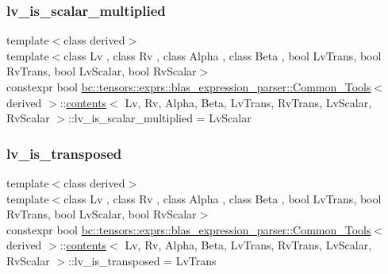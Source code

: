 \subsubsection{\texorpdfstring{lv\+\_\+is\+\_\+scalar\+\_\+multiplied}{lv\_is\_scalar\_multiplied}}
{\footnotesize\ttfamily template$<$class derived$>$ \\
template$<$class Lv , class Rv , class Alpha , class Beta , bool Lv\+Trans, bool Rv\+Trans, bool Lv\+Scalar, bool Rv\+Scalar$>$ \\
constexpr bool \hyperlink{structbc_1_1tensors_1_1exprs_1_1blas__expression__parser_1_1Common__Tools}{bc\+::tensors\+::exprs\+::blas\+\_\+expression\+\_\+parser\+::\+Common\+\_\+\+Tools}$<$ derived $>$\+::\hyperlink{structbc_1_1tensors_1_1exprs_1_1blas__expression__parser_1_1Common__Tools_1_1contents}{contents}$<$ Lv, Rv, Alpha, Beta, Lv\+Trans, Rv\+Trans, Lv\+Scalar, Rv\+Scalar $>$\+::lv\+\_\+is\+\_\+scalar\+\_\+multiplied = Lv\+Scalar\hspace{0.3cm}{\ttfamily [static]}}

\mbox{\label{structbc_1_1tensors_1_1exprs_1_1blas__expression__parser_1_1Common__Tools_1_1contents_a70834b5071003cd8b6992a2304e4fb9d}} 
\subsubsection{\texorpdfstring{lv\+\_\+is\+\_\+transposed}{lv\_is\_transposed}}
{\footnotesize\ttfamily template$<$class derived$>$ \\
template$<$class Lv , class Rv , class Alpha , class Beta , bool Lv\+Trans, bool Rv\+Trans, bool Lv\+Scalar, bool Rv\+Scalar$>$ \\
constexpr bool \hyperlink{structbc_1_1tensors_1_1exprs_1_1blas__expression__parser_1_1Common__Tools}{bc\+::tensors\+::exprs\+::blas\+\_\+expression\+\_\+parser\+::\+Common\+\_\+\+Tools}$<$ derived $>$\+::\hyperlink{structbc_1_1tensors_1_1exprs_1_1blas__expression__parser_1_1Common__Tools_1_1contents}{contents}$<$ Lv, Rv, Alpha, Beta, Lv\+Trans, Rv\+Trans, Lv\+Scalar, Rv\+Scalar $>$\+::lv\+\_\+is\+\_\+transposed = Lv\+Trans\hspace{0.3cm}{\ttfamily [static]}}

